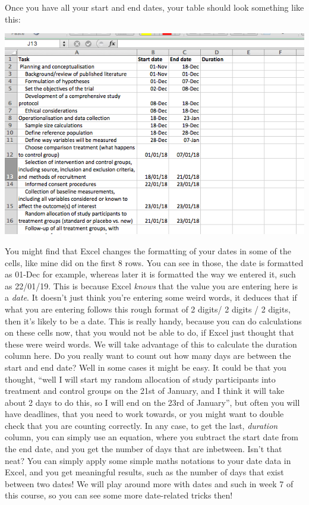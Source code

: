 \documentclass[]{book}
\theoremstyle{definition}
\theoremstyle{definition}
\theoremstyle{definition}
\theoremstyle{remark}
\begin{document}
Once you have all your start and end dates, your table should look
something like this:

\includegraphics{imgs/gantt_start_end.png}

You might find that Excel changes the formatting of your dates in some
of the cells, like mine did on the first 8 rows. You can see in those,
the date is formatted as 01-Dec for example, whereas later it is
formatted the way we entered it, such as 22/01/19. This is because Excel
\emph{knows} that the value you are entering here is a \emph{date}. It
doesn't just think you're entering some weird words, it deduces that if
what you are entering follows this rough format of 2 digits/ 2 digits /
2 digits, then it's likely to be a date. This is really handy, because
you can do calculations on these cells now, that you would not be able
to do, if Excel just thought that these were weird words. We will take
advantage of this to calculate the duration column here. Do you really
want to count out how many days are between the start and end date? Well
in some cases it might be easy. It could be that you thought, ``well I
will start my random allocation of study participants into treatment and
control groups on the 21st of January, and I think it will take about 2
days to do this, so I will end on the 23rd of January'', but often you
will have deadlines, that you need to work towards, or you might want to
double check that you are counting correctly. In any case, to get the
last, \emph{duration} column, you can simply use an equation, where you
subtract the start date from the end date, and you get the number of
days that are inbetween. Isn't that neat? You can simply apply some
simple maths notations to your date data in Excel, and you get
meaningful results, such as the number of days that exist between two
dates! We will play around more with dates and such in week 7 of this
course, so you can see some more date-related tricks then!
\end{document}
